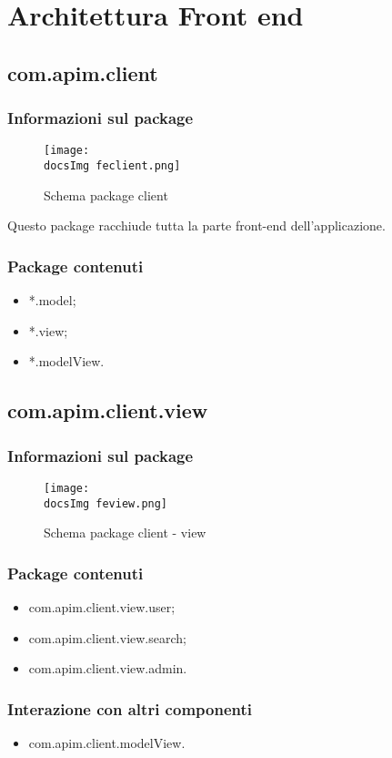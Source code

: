 \section{Architettura Front end}{
	\subsection{com.apim.client}{
		\subsubsection{Informazioni sul package}{
			\begin{figure}[ht]
				\centering
				\texttt{[image: \\docsImg feclient.png]}
				\caption{Schema package client}
			\end{figure}
		Questo package racchiude tutta la parte front-end dell'applicazione.
		}
		\subsubsection {Package contenuti}{
			\begin{itemize}
				\item *.model;
				\item *.view;
				\item *.modelView.
			\end{itemize}
		}
	}
	\subsection{com.apim.client.view}{
		\subsubsection{Informazioni sul package}{
			\begin{figure}[ht]
				\centering
				\texttt{[image: \\docsImg feview.png]}
				\caption{Schema package client - view}
			\end{figure}
		}
		\subsubsection{Package contenuti}{
			\begin{itemize}
				\item com.apim.client.view.user;
				\item com.apim.client.view.search;
				\item com.apim.client.view.admin.
			\end{itemize}
		}
		\subsubsection{Interazione con altri componenti}{
			\begin{itemize}
				\item com.apim.client.modelView.
			\end{itemize}
		}
}}

